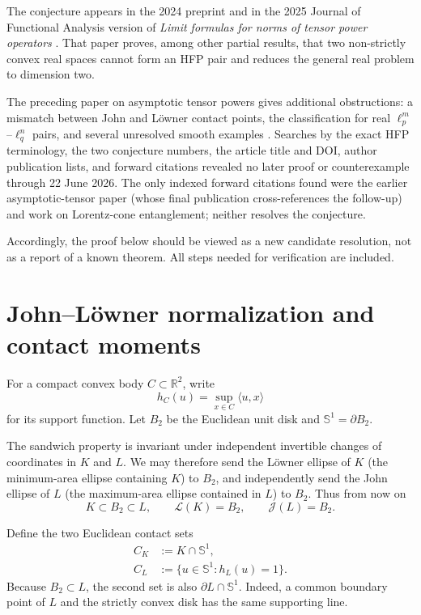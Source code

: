 \documentclass[11pt]{amsart}
\theoremstyle{definition}
\theoremstyle{remark}
\newcommand{\R}{\mathbb R}
\newcommand{\Sph}{\mathbb S^1}
\newcommand{\B}{B_2}
\newcommand{\Loew}{\mathcal L}
\newcommand{\John}{\mathcal J}
\newcommand{\ip}[2]{\langle #1,#2\rangle}
\begin{document}
The conjecture appears in the 2024 preprint and in the 2025 Journal of
Functional Analysis version of \emph{Limit formulas for norms of tensor power
operators} \cite{AMH-limit}.  That paper proves, among other partial results,
that two non-strictly convex real spaces cannot form an HFP pair and reduces
the general real problem to dimension two.

The preceding paper on asymptotic tensor powers gives additional obstructions:
a mismatch between John and L\"owner contact points, the classification for
real $\ell_p^m$--$\ell_q^n$ pairs, and several unresolved smooth examples
\cite[Section 5.2]{AMH-asymptotic}.  Searches by the exact HFP terminology,
the two conjecture numbers, the article title and DOI, author publication
lists, and forward citations revealed no later proof or counterexample through
22 June 2026.  The only indexed forward citations found were the earlier
asymptotic-tensor paper (whose final publication cross-references the follow-up)
and work on Lorentz-cone entanglement; neither resolves the conjecture.

Accordingly, the proof below should be viewed as a new candidate resolution,
not as a report of a known theorem.  All steps needed for verification are
included.

\section{John--L\"owner normalization and contact moments}\label{sec:normal}

For a compact convex body $C\subset\R^2$, write
\[
 h_C(u)=\sup_{x\in C}\ip{u}{x}
\]
for its support function.  Let $\B$ be the Euclidean unit disk and
$\Sph=\partial\B$.

The sandwich property is invariant under independent invertible changes of
coordinates in $K$ and $L$.  We may therefore send the L\"owner ellipse of
$K$ (the minimum-area ellipse containing $K$) to $\B$, and independently send
the John ellipse of $L$ (the maximum-area ellipse contained in $L$) to $\B$.
Thus from now on
\begin{equation}\label{eq:normal}
 K\subset \B\subset L,
 \qquad \Loew(K)=\B,
 \qquad \John(L)=\B.
\end{equation}

Define the two Euclidean contact sets
\begin{align*}
 C_K&:=K\cap\Sph,\\
 C_L&:=\{u\in\Sph:h_L(u)=1\}.
\end{align*}
Because $\B\subset L$, the second set is also $\partial L\cap\Sph$.  Indeed,
a common boundary point of $L$ and the strictly convex disk has the same
supporting line.
\end{document}
